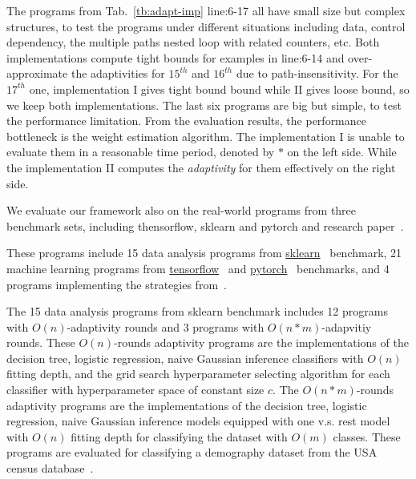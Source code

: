 %
The programs from Tab.~\ref{tb:adapt-imp} line:6-17 all have small size but complex structures, to test the programs under different situations including
data, control dependency,
the multiple paths nested loop with related counters, etc.
Both implementations compute tight bounds for examples in line:6-14
and over-approximate the adaptivities for $15^{th}$ and $16^{th}$ due to path-insensitivity.
For the $17^{th}$ one, implementation I gives tight bound bound while II gives loose bound, so we keep both implementations.
The last six programs are big but simple,
to test the performance limitation. 
From the evaluation results, the performance bottleneck is the weight estimation algorithm.
The implementation I
is unable to evaluate them in a reasonable time period, denoted by $*$ on the left side.
While the implementation II computes the \emph{adaptivity} for
them effectively on the right side. 



We evaluate our framework also on the real-world programs from
three benchmark sets, including thensorflow, sklearn and pytorch and research paper~\cite{Jamieson2015TheAO}.

These programs include  
15 data analysis programs 
from \hyperlink{https://github.com/scikit-learn/scikit-learn/tree/main/examples}{sklearn}~\cite{SklearnBenchmark} benchmark,
21 machine learning programs
from \hyperlink{https://github.com/tensorflow/tensorflow/tree/master/tensorflow/examples}{tensorflow}~\cite{TensorflowBenchmark} 
and \hyperlink{https://github.com/pytorch/pytorch}{pytorch}~\cite{PytorchBenchmark}
benchmarks,
and 4 programs implementing the strategies from~\cite{Jamieson2015TheAO}.

The 15 data analysis programs 
from sklearn benchmark includes 12 programs with $O(n)$-adaptivity rounds
and 3 programs with $O(n*m)$-adapvitiy rounds.
These $O(n)$-rounds adaptivity programs are
the
implementations of the decision tree, logistic regression, naive Gaussian inference classifiers
with $O(n)$ fitting depth,
and the grid search hyperparameter selecting algorithm for each classifier with 
hyperparameter space of constant size $c$.
The $O(n*m)$-rounds adaptivity programs are
the implementations of the  decision tree, logistic regression, naive Gaussian inference models equipped with one v.s. rest model with $O(n)$ fitting depth for classifying the dataset with $O(m)$ classes.
These programs are evaluated for classifying a demography dataset from 
the USA census database~\cite{CensusDatabase}.


